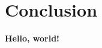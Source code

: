 \documentclass[../main.tex]{subfiles}
\begin{document}
    
\chapter{Conclusion}
    
\textbf{Hello, world!}
\end{document}

